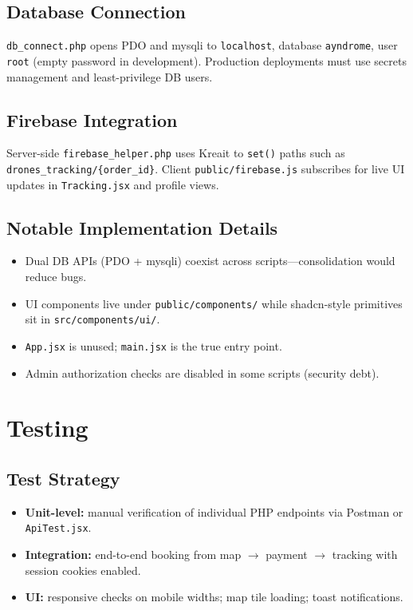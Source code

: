 \documentclass[12pt,a4paper,oneside]{report}
\begin{document}
\section{Database Connection}
\texttt{db\_connect.php} opens PDO and mysqli to \texttt{localhost}, database
\texttt{ayndrome}, user \texttt{root} (empty password in development). Production deployments
must use secrets management and least-privilege DB users.

\section{Firebase Integration}
Server-side \texttt{firebase\_helper.php} uses Kreait to \texttt{set()} paths such as
\texttt{drones\_tracking/\{order\_id\}}. Client \texttt{public/firebase.js} subscribes for live
UI updates in \texttt{Tracking.jsx} and profile views.

\section{Notable Implementation Details}
\begin{itemize}
    \item Dual DB APIs (PDO + mysqli) coexist across scripts---consolidation would reduce bugs.
    \item UI components live under \texttt{public/components/} while shadcn-style primitives sit
          in \texttt{src/components/ui/}.
    \item \texttt{App.jsx} is unused; \texttt{main.jsx} is the true entry point.
    \item Admin authorization checks are disabled in some scripts (security debt).
\end{itemize}

\chapter{Testing}

\section{Test Strategy}
\begin{itemize}
    \item \textbf{Unit-level:} manual verification of individual PHP endpoints via Postman or
          \texttt{ApiTest.jsx}.
    \item \textbf{Integration:} end-to-end booking from map $\rightarrow$ payment $\rightarrow$
          tracking with session cookies enabled.
    \item \textbf{UI:} responsive checks on mobile widths; map tile loading; toast notifications.
\end{itemize}
\end{document}
